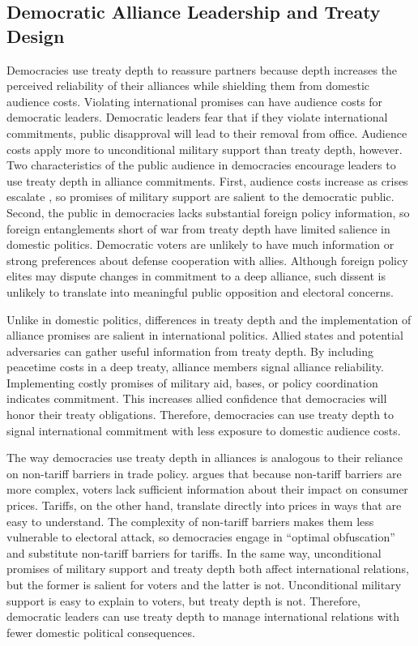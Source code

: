 \documentclass[12pt]{article}
\begin{document}
\subsection{Democratic Alliance Leadership and Treaty Design}


Democracies use treaty depth to reassure partners because depth increases the perceived reliability of their alliances while shielding them from domestic audience costs. 
Violating international promises can have audience costs for democratic leaders.
Democratic leaders fear that if they violate international commitments, public disapproval will lead to their removal from office.  
Audience costs apply more to unconditional military support than treaty depth, however. 
Two characteristics of the public audience in democracies encourage leaders to use treaty depth in alliance commitments.  
First, audience costs increase as crises escalate \citep{Tomz2007}, so promises of military support are salient to the democratic public.  
Second, the public in democracies lacks substantial foreign policy information, so foreign entanglements short of war from treaty depth have limited salience in domestic politics. 
Democratic voters are unlikely to have much information or strong preferences about defense cooperation with allies. 
Although foreign policy elites may dispute changes in commitment to a deep alliance, such dissent is unlikely to translate 
into meaningful public opposition and electoral concerns.


Unlike in domestic politics, differences in treaty depth and the implementation of alliance promises are salient in international politics. 
Allied states and potential adversaries can gather useful information from treaty depth. 
By including peacetime costs in a deep treaty, alliance members signal alliance reliability. 
Implementing costly promises of military aid, bases, or policy coordination indicates commitment. 
This increases allied confidence that democracies will honor their treaty obligations. 
Therefore, democracies can use treaty depth to signal international commitment with less exposure to domestic audience costs. 


The way democracies use treaty depth in alliances is analogous to their reliance on non-tariff barriers in trade policy.
\citet{Kono2006} argues that because non-tariff barriers are more complex, voters lack sufficient information about their impact on consumer prices.
Tariffs, on the other hand, translate directly into prices in ways that are easy to understand.
The complexity of non-tariff barriers makes them less vulnerable to electoral attack, so democracies engage in ``optimal obfuscation'' and substitute non-tariff barriers for tariffs. 
In the same way, unconditional promises of military support and treaty depth both affect international relations, but the former is salient for voters and the latter is not. 
Unconditional military support is easy to explain to voters, but treaty depth is not. 
Therefore, democratic leaders can use treaty depth to manage international relations with fewer domestic political consequences.
\end{document}
